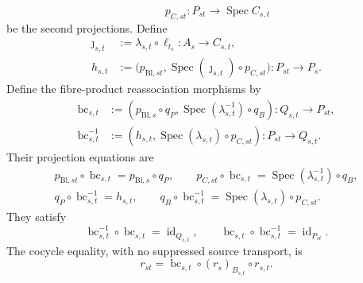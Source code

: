 \begin{lemma}
\[    \qquad
    p_{C,st}\colon P_{st}\to\operatorname{Spec}C_{s,t}
  \]
  be the second projections.  Define
  \[
  \begin{aligned}
    \jmath_{s,t}&:=\lambda_{s,t}\circ\ell_{t_s}\colon
      A_s\longrightarrow C_{s,t},\\
    h_{s,t}&:=
      \bigl(p_{\mathrm{Bl},st},
        \operatorname{Spec}(\jmath_{s,t})\circ p_{C,st}\bigr)
      \colon P_{st}\longrightarrow P_s.
  \end{aligned}
  \]
  Define the fibre-product reassociation morphisms by
  \[
  \begin{aligned}
    \operatorname{bc}_{s,t}
      &:=(p_{\mathrm{Bl},s}\circ q_P,
        \operatorname{Spec}(\lambda_{s,t}^{-1})\circ q_B)
        \colon Q_{s,t}\longrightarrow P_{st},\\
    \operatorname{bc}_{s,t}^{-1}
      &:=(h_{s,t},
        \operatorname{Spec}(\lambda_{s,t})\circ p_{C,st})
        \colon P_{st}\longrightarrow Q_{s,t}.
  \end{aligned}
  \]
  Their projection equations are
  \[
  \begin{gathered}
    p_{\mathrm{Bl},st}\circ\operatorname{bc}_{s,t}
      =p_{\mathrm{Bl},s}\circ q_P,
    \qquad
    p_{C,st}\circ\operatorname{bc}_{s,t}
      =\operatorname{Spec}(\lambda_{s,t}^{-1})\circ q_B,\\
    q_P\circ\operatorname{bc}_{s,t}^{-1}=h_{s,t},
    \qquad
    q_B\circ\operatorname{bc}_{s,t}^{-1}
      =\operatorname{Spec}(\lambda_{s,t})\circ p_{C,st}.
  \end{gathered}
  \]
  They satisfy
  \[
    \operatorname{bc}_{s,t}^{-1}\circ\operatorname{bc}_{s,t}
      =\operatorname{id}_{Q_{s,t}},
    \qquad
    \operatorname{bc}_{s,t}\circ\operatorname{bc}_{s,t}^{-1}
      =\operatorname{id}_{P_{st}}.
  \]
  The cocycle equality, with no suppressed source transport, is
  \[
    r_{st}
      =\operatorname{bc}_{s,t}\circ(r_s)_{B_{s,t}}\circ r_{s,t}.
  \]
\end{lemma}

